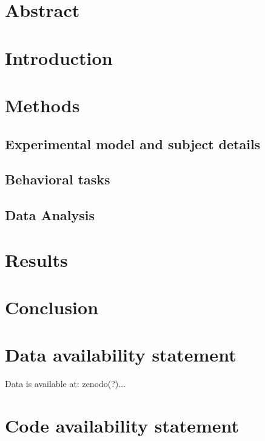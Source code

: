 \documentclass{article}
\begin{document}

\section{Abstract}


\section{Introduction}


\section{Methods}
\subsection{Experimental model and subject details}
\subsection{Behavioral tasks}

\subsection{Data Analysis}


\section{Results}

\section{Conclusion}


% 


\section{Data availability statement}

Data is available at: zenodo(?)...

\section{Code availability statement}
\end{document}
